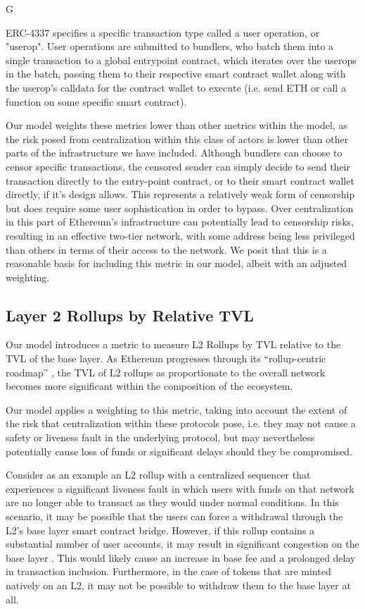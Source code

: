 G\documentclass[conference]{IEEEtran}
\begin{document}
ERC-4337 specifies a specific transaction type called a user operation, or "userop".  User operations are submitted to bundlers, who batch them into a single transaction to a global entrypoint contract, which iterates over the userops in the batch, passing them to their respective smart contract wallet along with the userop's calldata for the contract wallet to execute (i.e. send ETH or call a function on some specific smart contract).

Our model weights these metrics lower than other metrics within the model, as the risk posed from centralization within this class of actors is lower than other parts of the infrastructure we have included.  Although bundlers can choose to censor specific transactions, the censored sender can simply decide to send their transaction directly to the entry-point contract, or to their smart contract wallet directly, if it's design allows.  This represents a relatively weak form of censorship but does require some user sophistication in order to bypass. Over centralization in this part of Ethereum's infrastructure can potentially lead to censorship risks, resulting in an effective two-tier network, with some address being less privileged than others in terms of their access to the network. We posit that this is a reasonable basis for including this metric in our model, albeit with an adjusted weighting.

\subsection{Layer 2 Rollups by Relative TVL}

Our model introduces a metric to measure L2 Rollups by TVL relative to the TVL of the base layer.  As Ethereum progresses through its “rollup-centric roadmap” \cite{buterin2020}, the TVL of L2 rollups as proportionate to the overall network becomes more significant within the composition of the ecosystem.

Our model applies a weighting to this metric, taking into account the extent of the risk that centralization within these protocols pose, i.e. they may not cause a safety or liveness fault in the underlying protocol, but may nevertheless potentially cause loss of funds or significant delays should they be compromised.

Consider as an example an L2 rollup with a centralized sequencer that experiences a significant liveness fault in which users with funds on that network are no longer able to transact as they would under normal conditions.  In this scenario, it may be possible that the users can force a withdrawal through the L2's base layer smart contract bridge.  However, if this rollup contains a substantial number of user accounts, it may result in significant congestion on the base layer \cite{gorzny2022ideal}.  This would likely cause an increase in base fee and a prolonged delay in transaction inclusion.  Furthermore, in the case of tokens that are minted natively on an L2, it may not be possible to withdraw them to the base layer at all.
\end{document}
